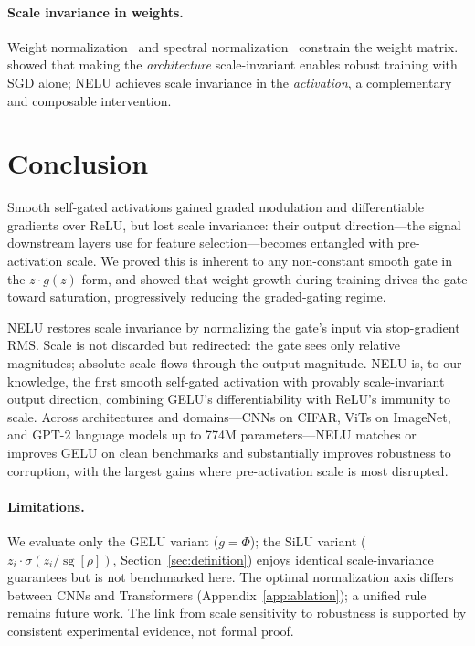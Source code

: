 \paragraph{Scale invariance in weights.}
Weight normalization~\citep{salimans2016weight} and spectral normalization~\citep{miyato2018spectral} constrain the weight matrix.
\citet{li2022robust} showed that making the \emph{architecture} scale-invariant enables robust training with SGD alone; NELU achieves scale invariance in the \emph{activation}, a complementary and composable intervention.


\section{Conclusion}\label{sec:conclusion}

Smooth self-gated activations gained graded modulation and differentiable gradients over ReLU, but lost scale invariance: their output direction---the signal downstream layers use for feature selection---becomes entangled with pre-activation scale.
We proved this is inherent to any non-constant smooth gate in the $z \cdot g(z)$ form, and showed that weight growth during training drives the gate toward saturation, progressively reducing the graded-gating regime.

NELU restores scale invariance by normalizing the gate's input via stop-gradient RMS.
Scale is not discarded but redirected: the gate sees only relative magnitudes; absolute scale flows through the output magnitude.
NELU is, to our knowledge, the first smooth self-gated activation with provably scale-invariant output direction, combining GELU's differentiability with ReLU's immunity to scale.
Across architectures and domains---CNNs on CIFAR, ViTs on ImageNet, and GPT-2 language models up to 774M parameters---NELU matches or improves GELU on clean benchmarks and substantially improves robustness to corruption, with the largest gains where pre-activation scale is most disrupted.

\paragraph{Limitations.}
We evaluate only the GELU variant ($g = \Phi$); the SiLU variant ($z_i \cdot \sigma(z_i / \operatorname{sg}[\rho])$, Section~\ref{sec:definition}) enjoys identical scale-invariance guarantees but is not benchmarked here.
The optimal normalization axis differs between CNNs and Transformers (Appendix~\ref{app:ablation}); a unified rule remains future work.
The link from scale sensitivity to robustness is supported by consistent experimental evidence, not formal proof.